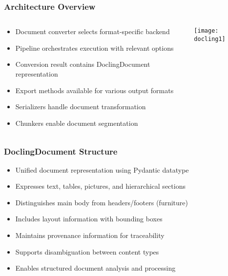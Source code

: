 \begin{frame}[fragile]\frametitle{Architecture Overview}
\begin{columns}
    \begin{column}[T]{0.4\linewidth}
      \begin{itemize}
		\item Document converter selects format-specific backend
		\item Pipeline orchestrates execution with relevant options
		\item Conversion result contains DoclingDocument representation
		\item Export methods available for various output formats
		\item Serializers handle document transformation
		\item Chunkers enable document segmentation
	  \end{itemize}

    \end{column}
    \begin{column}[T]{0.6\linewidth}
		\begin{center}
		\texttt{[image: docling1]}
		\end{center}	
    \end{column}
  \end{columns}
\end{frame}

\begin{frame}[fragile]\frametitle{DoclingDocument Structure}
      \begin{itemize}
	\item Unified document representation using Pydantic datatype
	\item Expresses text, tables, pictures, and hierarchical sections
	\item Distinguishes main body from headers/footers (furniture)
	\item Includes layout information with bounding boxes
	\item Maintains provenance information for traceability
	\item Supports disambiguation between content types
	\item Enables structured document analysis and processing
	  \end{itemize}
\end{frame}

